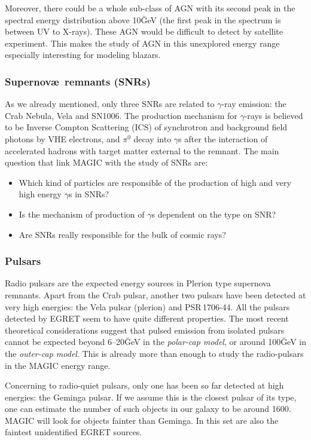 Moreover, there could be a whole sub-class of AGN with its second peak
in the spectral energy distribution above 10\u{GeV} (the first peak in
the spectrum is between UV to X-rays). These AGN would be difficult to
detect by satellite experiment. This makes the study of AGN in this
unexplored energy range especially interesting for modeling blazars.

\subsubsection*{Supernov\ae\ remnants (SNRs)}
% 
As we already mentioned, only three SNRs are related to $\gamma$-ray
emission: the Crab Nebula, Vela and SN1006. The production mechanism
for $\gamma$-rays is believed to be Inverse Compton Scattering (ICS)
of synchrotron and background field photons by VHE electrons, and
$\pi^0$ decay into $\gamma$s after the interaction of accelerated
hadrons with target matter external to the remnant. The main question
that link MAGIC with the study of SNRs are:
%
\begin{itemize}
\item Which kind of particles are responsible of the production of
high and very high energy $\gamma$s in SNRs?
\item Is the mechanism of production of $\gamma$s dependent on the
type on SNR?
\item Are SNRs really responsible for the bulk of cosmic rays?
\end{itemize}

\subsubsection*{Pulsars} 
%
Radio pulsars are the expected energy sources in Plerion type
supernova remnants. Apart from the Crab pulsar, another two pulsars
have been detected at very high energies: the Vela pulsar (plerion)
and PSR\,1706-44. All the pulsars detected by EGRET seem to have quite
different properties. The most recent theoretical considerations
suggest that pulsed emission from isolated pulsars cannot be expected
beyond 6--20\u{GeV} in the \emph{polar-cap model}, or around
100\u{GeV} in the \emph{outer-cap model}. This is already more than
enough to study the radio-pulsars in the MAGIC energy range.

Concerning to radio-quiet pulsars, only one has been so far detected
at high energies: the Geminga pulsar. If we assume this is the closest
pulsar of its type, one can estimate the number of such objects in our
galaxy to be around 1600. MAGIC will look for objects fainter than
Geminga. In this set are also the faintest unidentified EGRET sources.

